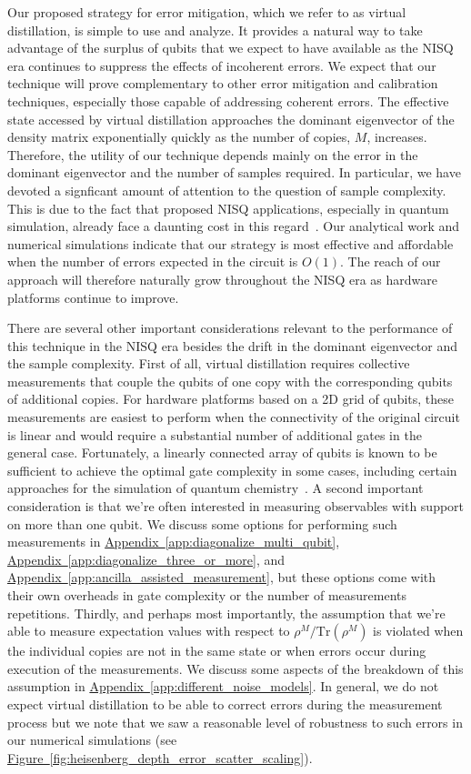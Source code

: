 \documentclass[
amsmath,
amssymb,
aps,
pra,
reprint,
twocolumn,
superscriptaddress,
longbibliography,
showkeys,
floatfix
]{revtex4-1}
\def\tr{\mathrm{Tr}}
\newcommand{\app}[1]{\hyperref[app:#1]{Appendix~\ref*{app:#1}}}
\newcommand{\fig}[1]{\hyperref[fig:#1]{Figure~\ref*{fig:#1}}}
\begin{document}
Our proposed strategy for error mitigation, which we refer to as virtual
distillation, is simple to use and analyze. 
It provides a natural way to take advantage of the surplus of qubits that we
expect to have available as the NISQ era continues to suppress the effects of
incoherent errors.
We expect that our technique will prove complementary to other error mitigation
and calibration techniques, especially those capable of addressing coherent
errors.
The effective state accessed by virtual distillation approaches the dominant
eigenvector of the density matrix exponentially quickly as the number of copies,
\(M\), increases.
Therefore, the utility of our technique depends mainly on the error in the
dominant eigenvector and the number of samples required.
In particular, we have devoted a signficant amount of attention to the question
of sample complexity. 
This is due to the fact that proposed NISQ applications, especially in quantum
simulation, already face a daunting cost in this regard~\cite{Huggins2019-vu}.
Our analytical work and numerical simulations indicate that our strategy is most
effective and affordable when the number of errors expected in the circuit is
\(O(1)\).
The reach of our approach will therefore naturally grow throughout the NISQ era
as hardware platforms continue to improve. 

There are several other important considerations relevant to the performance of
this technique in the NISQ era besides the drift in the dominant eigenvector and
the sample complexity.
First of all, virtual distillation requires collective measurements that couple
the qubits of one copy with the corresponding qubits of additional copies.
For hardware platforms based on a 2D grid of qubits, these measurements are
easiest to perform when the connectivity of the original circuit is linear and
would require a substantial number of additional gates in the general case.
Fortunately, a linearly connected array of qubits is known to be sufficient to
achieve the optimal gate complexity in some cases, including certain approaches
for the simulation of quantum chemistry~\cite{Kivlichan2018-yz, OGorman2019-jj}. 
A second important consideration is that we're often interested in measuring
observables with support on more than one qubit. 
We discuss some options for performing such measurements in
\app{diagonalize_multi_qubit}, \app{diagonalize_three_or_more}, and
\app{ancilla_assisted_measurement}, but these options come with their own
overheads in gate complexity or the number of measurements repetitions.
Thirdly, and perhaps most importantly, the assumption that we're able to measure
expectation values with respect to \(\rho^M / \tr(\rho^M)\) is violated when the
individual copies are not in the same state or when errors occur during
execution of the measurements. We discuss some aspects of the breakdown of this
assumption in \app{different_noise_models}. In general, we do not expect virtual
distillation to be able to correct errors during the measurement process but we
note that we saw a reasonable level of robustness to such errors in our
numerical simulations (see \fig{heisenberg_depth_error_scatter_scaling}).
\end{document}

